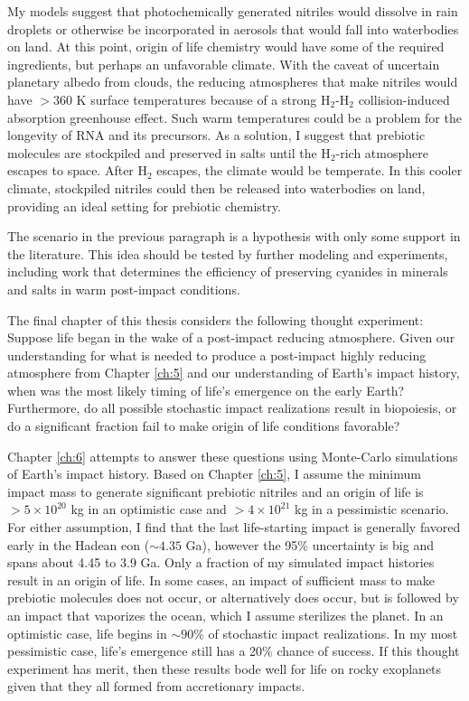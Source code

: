 My models suggest that photochemically generated nitriles would dissolve in rain droplets or otherwise be incorporated in aerosols that would fall into waterbodies on land. 
At this point, origin of life chemistry would have some of the required ingredients, but perhaps an unfavorable climate. With the caveat of uncertain planetary albedo from clouds, the reducing atmospheres that make nitriles would have $> 360$ K surface temperatures because of a strong H$_2$-H$_2$ collision-induced absorption greenhouse effect. Such warm temperatures could be a problem for the longevity of RNA and its precursors. As a solution, I suggest that prebiotic molecules are stockpiled and preserved in salts until the H$_2$-rich atmosphere escapes to space. After H$_2$ escapes, the climate would be temperate. In this cooler climate, stockpiled nitriles could then be released into waterbodies on land, providing an ideal setting for prebiotic chemistry.

The scenario in the previous paragraph is a hypothesis with only some support in the literature. This idea should be tested by further modeling and experiments, including work that determines the efficiency of preserving cyanides in minerals and salts in warm post-impact conditions.

The final chapter of this thesis considers the following thought experiment: Suppose life began in the wake of a post-impact reducing atmosphere. Given our understanding for what is needed to produce a post-impact highly reducing atmosphere from Chapter \ref{ch:5} and our understanding of Earth's impact history, when was the most likely timing of life's emergence on the early Earth? Furthermore, do all possible stochastic impact realizations result in biopoiesis, or do a significant fraction fail to make origin of life conditions favorable? 

Chapter \ref{ch:6} attempts to answer these questions using Monte-Carlo simulations of Earth's impact history. Based on Chapter \ref{ch:5}, I assume the minimum impact mass to generate significant prebiotic nitriles and an origin of life is $> 5 \times 10^{20}$ kg in an optimistic case and $> 4 \times 10^{21}$ kg in a pessimistic scenario. For either assumption, I find that the last life-starting impact is generally favored early in the Hadean eon ($\sim 4.35$ Ga), however the 95\% uncertainty is big and spans about 4.45 to 3.9 Ga. Only a fraction of my simulated impact histories result in an origin of life. In some cases, an impact of sufficient mass to make prebiotic molecules does not occur, or alternatively does occur, but is followed by an impact that vaporizes the ocean, which I assume sterilizes the planet. In an optimistic case, life begins in $\sim 90\%$ of stochastic impact realizations. In my most pessimistic case, life's emergence still has a 20\% chance of success. If this thought experiment has merit, then these results bode well for life on rocky exoplanets given that they all formed from accretionary impacts.

